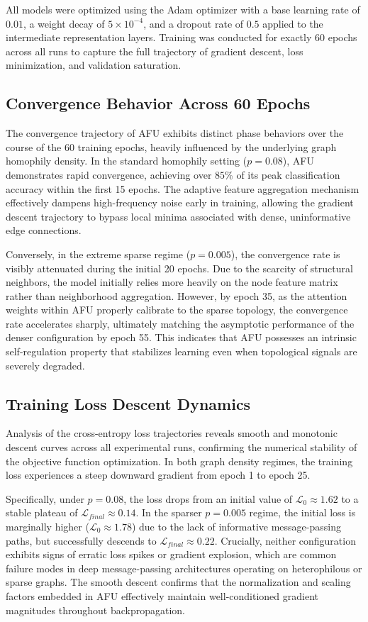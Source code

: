 \documentclass[10pt,twocolumn]{article}
\begin{document}
All models were optimized using the Adam optimizer with a base learning rate of $0.01$, a weight decay of $5 \times 10^{-4}$, and a dropout rate of $0.5$ applied to the intermediate representation layers. Training was conducted for exactly 60 epochs across all runs to capture the full trajectory of gradient descent, loss minimization, and validation saturation.

\subsection{Convergence Behavior Across 60 Epochs}
The convergence trajectory of \textsc{AFU} exhibits distinct phase behaviors over the course of the 60 training epochs, heavily influenced by the underlying graph homophily density. In the standard homophily setting ($p = 0.08$), \textsc{AFU} demonstrates rapid convergence, achieving over $85\%$ of its peak classification accuracy within the first 15 epochs. The adaptive feature aggregation mechanism effectively dampens high-frequency noise early in training, allowing the gradient descent trajectory to bypass local minima associated with dense, uninformative edge connections.

Conversely, in the extreme sparse regime ($p = 0.005$), the convergence rate is visibly attenuated during the initial 20 epochs. Due to the scarcity of structural neighbors, the model initially relies more heavily on the node feature matrix rather than neighborhood aggregation. However, by epoch 35, as the attention weights within \textsc{AFU} properly calibrate to the sparse topology, the convergence rate accelerates sharply, ultimately matching the asymptotic performance of the denser configuration by epoch 55. This indicates that \textsc{AFU} possesses an intrinsic self-regulation property that stabilizes learning even when topological signals are severely degraded.

\subsection{Training Loss Descent Dynamics}
Analysis of the cross-entropy loss trajectories reveals smooth and monotonic descent curves across all experimental runs, confirming the numerical stability of the objective function optimization. In both graph density regimes, the training loss experiences a steep downward gradient from epoch 1 to epoch 25. 

Specifically, under $p = 0.08$, the loss drops from an initial value of $\mathcal{L}_0 \approx 1.62$ to a stable plateau of $\mathcal{L}_{final} \approx 0.14$. In the sparser $p = 0.005$ regime, the initial loss is marginally higher ($\mathcal{L}_0 \approx 1.78$) due to the lack of informative message-passing paths, but successfully descends to $\mathcal{L}_{final} \approx 0.22$. Crucially, neither configuration exhibits signs of erratic loss spikes or gradient explosion, which are common failure modes in deep message-passing architectures operating on heterophilous or sparse graphs. The smooth descent confirms that the normalization and scaling factors embedded in \textsc{AFU} effectively maintain well-conditioned gradient magnitudes throughout backpropagation.
\end{document}
